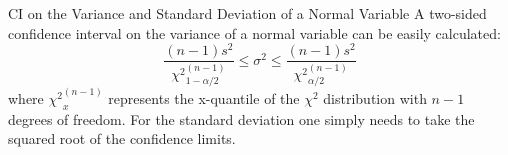 
\begin{frame}{CI on the Variance and Standard Deviation of a Normal Variable}
A two-sided confidence interval on the variance of a normal variable can be easily calculated:
\begin{equation*}
\frac{(n-1)s^2}{{\chi^2}_{1 - \alpha/2}^{(n-1)}}\leq\sigma^2\leq\frac{(n-1)s^2}{{\chi^2}_{\alpha/2}^{(n-1)}}
\end{equation*}
\noindent where ${\chi^2}_{x}^{(n-1)}$ represents the x-quantile of the $\chi^2$ distribution with $n-1$ degrees of freedom. For the standard deviation one simply needs to take the squared root of the confidence limits.
\end{frame}


%

